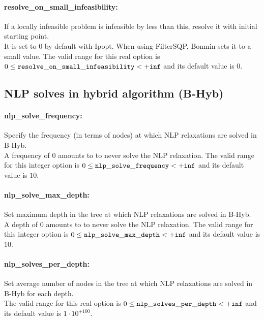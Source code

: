 \paragraph{resolve\_on\_small\_infeasibility:}\label{opt:resolve_on_small_infeasibility} If a locally infeasible problem is infeasible by less than this, resolve it with initial starting point. \\
 It is set to 0 by default with Ipopt. When using FilterSQP, Bonmin sets it to a small value. The valid range for this real option is 
$0 \le {\tt resolve\_on\_small\_infeasibility } <  {\tt +inf}$
and its default value is $0$.


\subsection{NLP solves in hybrid algorithm (B-Hyb)}
\label{sec:NLPsolvesinhybridalgorithm(B-Hyb)}
\paragraph{nlp\_solve\_frequency:}\label{opt:nlp_solve_frequency} Specify the frequency (in terms of nodes) at which NLP relaxations are solved in B-Hyb. \\
 A frequency of 0 amounts to to never solve the NLP relaxation. The valid range for this integer option is
$0 \le {\tt nlp\_solve\_frequency } <  {\tt +inf}$
and its default value is $10$.


\paragraph{nlp\_solve\_max\_depth:}\label{opt:nlp_solve_max_depth} Set maximum depth in the tree at which NLP relaxations are solved in B-Hyb. \\
 A depth of 0 amounts to to never solve the NLP relaxation. The valid range for this integer option is
$0 \le {\tt nlp\_solve\_max\_depth } <  {\tt +inf}$
and its default value is $10$.


\paragraph{nlp\_solves\_per\_depth:}\label{opt:nlp_solves_per_depth} Set average number of nodes in the tree at which NLP relaxations are solved in B-Hyb for each depth. \\
 The valid range for this real option is 
$0 \le {\tt nlp\_solves\_per\_depth } <  {\tt +inf}$
and its default value is $1 \cdot 10^{+100}$.


